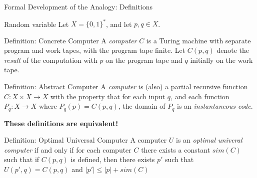 \documentclass{beamer}
\begin{document}
\begin{frame}{Formal Development of the Analogy: Definitions}

\begin{structure}{Random variable}
 Let $X = \{0, 1\}^*$, and let $p, q \in X$.
\end{structure}

\medskip

\begin{structure}{Definition: Concrete Computer}
 A \emph{computer} $C$ is a Turing machine with separate program and work tapes,
 with the program tape finite.  Let $C(p, q)$ denote the \emph{result} of the
 computation with $p$ on the program tape and $q$ initially on the work tape.
\end{structure}

\medskip

\begin{structure}{Definition: Abstract Computer}
 A \emph{computer} is (also) a partial recursive function
 $C : X \times X \rightarrow X$ with the property that for each input
 $q$, and each function $P_q : X \rightarrow X$ where $P_q(p) = C(p, q)$,
 the domain of $P_q$ is an \emph{instantaneous code}.
\end{structure}

\smallskip

\textbf{These definitions are equivalent!}

\smallskip

\begin{structure}{Definition: Optimal Universal Computer}
 A computer $U$ is an \emph{optimal univeral computer} if and only if for each
 computer $C$ there exists a constant $sim(C)$ such that if $C(p, q)$
 is defined, then there exists $p\prime$ such that
 $U(p\prime, q) = C(p, q)$ and $\vert p\prime \vert \leq \vert p \vert + sim(C)$

\end{structure}

\end{frame}

\end{document}
